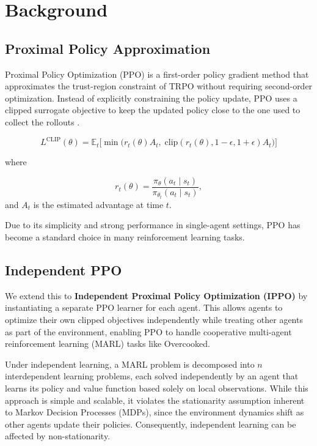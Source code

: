 \documentclass{article}
\begin{document}
\section{Background}

\subsection{Proximal Policy Approximation}

Proximal Policy Optimization (PPO) is a first-order policy gradient method
that approximates the trust-region constraint of TRPO without requiring
second-order optimization. Instead of explicitly constraining the policy
update, PPO uses a clipped surrogate objective to keep the updated policy
close to the one used to collect the rollouts
\cite{schulman2017proximalpolicyoptimizationalgorithms}.

\begin{equation}
L^{\mathrm{CLIP}}(\theta) =
\mathbb{E}_t \Big[
\min\big(
r_t(\theta) A_t,\;
\mathrm{clip}(r_t(\theta), 1-\epsilon, 1+\epsilon) A_t
\big)
\Big]
\end{equation}

where 

\begin{equation}
r_t(\theta) =
\frac{\pi_\theta(a_t \mid s_t)}{\pi_{\theta_t}(a_t \mid s_t)},
\end{equation}
and $A_t$ is the estimated advantage at time $t$.

Due to its simplicity and strong performance in single-agent settings, PPO has
become a standard choice in many reinforcement learning tasks. 

\subsection{Independent PPO}

We extend this to \textbf{Independent Proximal Policy Optimization (IPPO)} by
instantiating a separate PPO learner for each agent. This allows agents to
optimize their own clipped objectives independently while treating other
agents as part of the environment, enabling PPO to handle cooperative
multi-agent reinforcement learning (MARL) tasks like Overcooked.

Under independent learning, a MARL problem is decomposed into $n$
interdependent learning problems, each solved independently by an agent that
learns its policy and value function based solely on local observations. While
this approach is simple and scalable, it violates the stationarity assumption
inherent to Markov Decision Processes (MDPs), since the environment dynamics
shift as other agents update their policies. Consequently, independent
learning can be affected by non-stationarity.
\end{document}
